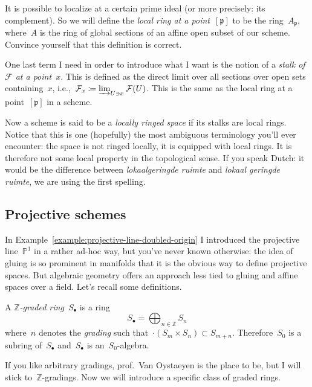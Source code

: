 It is possible to localize at a certain prime ideal (or more precisely: its complement). So we will define the \emph{local ring at a point~$[\mathfrak{p}]$} to be the ring~$A_{\mathfrak{p}}$, where~$A$ is the ring of global sections of an affine open subset of our scheme. Convince yourself that this definition is correct.

One last term I need in order to introduce what I want is the notion of a \emph{stalk of~$\mathcal{F}$ at a point~$x$}. This is defined as the direct limit over all sections over open sets containing~$x$, i.e.,~$\mathcal{F}_x\coloneqq\varinjlim_{U\ni x}\mathcal{F}(U)$. This is the same as the local ring at a point~$[\mathfrak{p}]$ in a scheme.

Now a scheme is said to be a \emph{locally ringed space} if its stalks are local rings. Notice that this is one (hopefully) the most ambiguous terminology you'll ever encounter: the space is not ringed locally, it is equipped with local rings. It is therefore not some local property in the topological sense. If you speak Dutch: it would be the difference between \emph{lokaalgeringde ruimte} and \emph{lokaal geringde ruimte}, we are using the first spelling.


\subsection{Projective schemes}

In Example~\ref{example:projective-line-doubled-origin} I introduced the projective line~$\mathbb{P}^1$ in a rather ad-hoc way, but you've never known otherwise: the idea of gluing is so prominent in manifolds that it is the obvious way to define projective spaces. But algebraic geometry offers an approach less tied to gluing and affine spaces over a field. Let's recall some definitions.

\begin{definition}
  A \emph{$\mathbb{Z}$-graded ring}~$S_\bullet$ is a ring
  \begin{equation}
    S_\bullet=\bigoplus_{n\in\mathbb{Z}}S_n
  \end{equation}
  where~$n$ denotes the \emph{grading} such that~$\cdot(S_m\times S_n)\subset S_{m+n}$. Therefore~$S_0$ is a subring of~$S_\bullet$ and~$S_\bullet$ is an~$S_0$\nobreakdash-algebra.
\end{definition}

If you like arbitrary gradings, prof.\ Van Oystaeyen is the place to be, but I will stick to~$\mathbb{Z}$\nobreakdash-gradings. Now we will introduce a specific class of graded rings.

